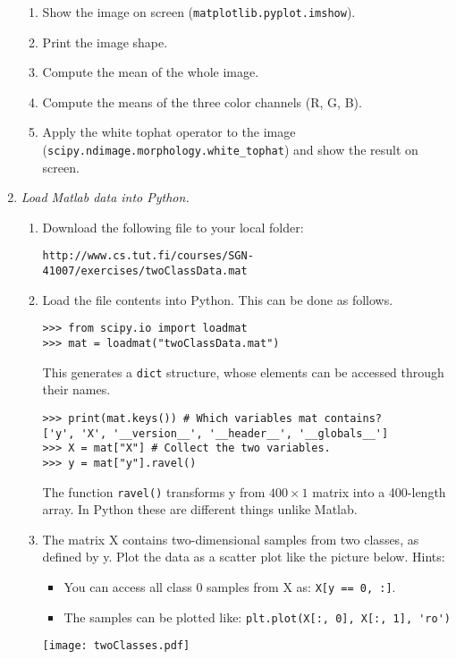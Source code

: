 \documentclass[a4paper,12pt]{scrartcl}
\newcommand{\python}{{\fbox{\texttt{\bfseries python}}\quad}}
\begin{document}
\begin{enumerate}
\begin{enumerate}
\item Show the image on screen (\verb|matplotlib.pyplot.imshow|).
\item Print the image shape.
\item Compute the mean of the whole image.
\item Compute the means of the three color channels (R, G, B).
\item Apply the white tophat operator to the image (\verb|scipy.ndimage.morphology.white_tophat|)
and show the result on screen.

\end{enumerate}

\item \python \emph{Load Matlab data into Python.}
\label{ex4}
\begin{enumerate}
\item Download the following file to your local folder:
{\small
\begin{verbatim}
http://www.cs.tut.fi/courses/SGN-41007/exercises/twoClassData.mat
\end{verbatim}
}
\item Load the file contents into Python. This can be done as follows.
\begin{lstlisting}
>>> from scipy.io import loadmat
>>> mat = loadmat("twoClassData.mat")
\end{lstlisting}
This generates a \lstinline|dict| structure, whose elements can be accessed through their names.
\begin{lstlisting}
>>> print(mat.keys()) # Which variables mat contains?
['y', 'X', '__version__', '__header__', '__globals__']
>>> X = mat["X"] # Collect the two variables.
>>> y = mat["y"].ravel()
\end{lstlisting}
The function \verb+ravel()+ transforms y from $400\times 1$ matrix into a 400-length array.
In Python these are different things unlike Matlab.

\item The matrix X contains two-dimensional samples from two
classes, as defined by y. Plot the data as a scatter plot
like the picture below.
Hints:
\begin{itemize}
	\item You can access all class 0 samples from X as: \verb+X[y == 0, :]+.
	\item The samples can be plotted like: \verb+plt.plot(X[:, 0], X[:, 1], 'ro')+
\end{itemize}
\centerline{\texttt{[image: twoClasses.pdf]}}


\end{enumerate}
\end{enumerate}
\end{document}
